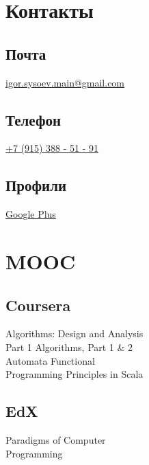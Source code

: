 \documentclass[a4paper]{curricula-vitae}
\begin{document}
\begin{minipage}[t]{0.33\textwidth}%

\section{Контакты} 

\subsection{Почта}
\href{mailto:igor.sysoev.main@gmail.com}{igor.sysoev.main@gmail.com}

\insertspace

\subsection{Телефон}
\href{tel:+79153885191}{+7 (915) 388 - 51 - 91}

\insertspace

\subsection{Профили}
\href{https://plus.google.com/+%D0%98%D0%B3%D0%BE%D1%80%D1%8C%D0%A1%D1%8B%D1%81%D0%BE%D0%B5%D0%B2}{Google Plus}

\insertspace

\section{MOOC}

\subsection{Coursera}
Algorithms: Design and Analysis \\
Part 1 \textbullet{} Algorithms, Part 1 \& 2 \\ 
Automata \textbullet{} Functional \\
Programming Principles in Scala

\insertspace

\subsection{EdX}
Paradigms of Computer \\
Programming

\insertspace


\end{minipage}
\end{document}
